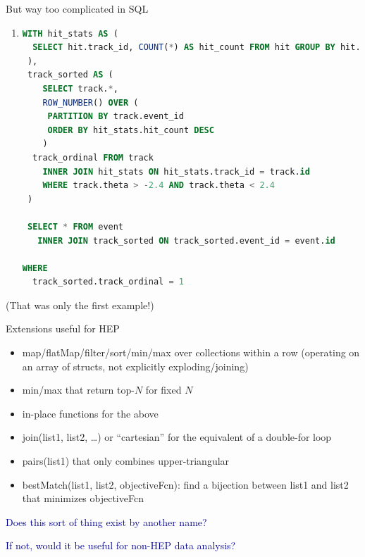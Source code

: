\documentclass{beamer}
\begin{document}
\begin{frame}[fragile]{But way too complicated in SQL}
\vspace{0.25 cm}
\begin{enumerate}
\item
\begin{lstlisting}[language=sql, basicstyle=\ttfamily\scriptsize]
 WITH hit_stats AS (
  SELECT hit.track_id, COUNT(*) AS hit_count FROM hit GROUP BY hit.track_id
 ),
 track_sorted AS (
    SELECT track.*, 
    ROW_NUMBER() OVER (
     PARTITION BY track.event_id
     ORDER BY hit_stats.hit_count DESC
    )
  track_ordinal FROM track 
    INNER JOIN hit_stats ON hit_stats.track_id = track.id
    WHERE track.theta > -2.4 AND track.theta < 2.4
 )

 SELECT * FROM event
   INNER JOIN track_sorted ON track_sorted.event_id = event.id

WHERE
  track_sorted.track_ordinal = 1
\end{lstlisting}
\end{enumerate}
(That was only the first example!)
\end{frame}

\begin{frame}{Extensions useful for HEP}
\vspace{0.25 cm}
\begin{itemize}
\item map/flatMap/filter/sort/min/max over collections within a row (operating on an array of structs, not explicitly exploding/joining)
\item min/max that return top-$N$ for fixed $N$
\item in-place functions for the above
\item join(list1, list2, \ldots) or ``cartesian'' for the equivalent of a double-for loop
\item pairs(list1) that only combines upper-triangular
\item bestMatch(list1, list2, objectiveFcn): find a bijection between list1 and list2 that minimizes objectiveFcn
\end{itemize}

\vspace{0.5 cm}
\textcolor{darkblue}{Does this sort of thing exist by another name?}

\vspace{0.5 cm}
\textcolor{darkblue}{If not, would it be useful for non-HEP data analysis?}
\end{frame}
\end{document}
